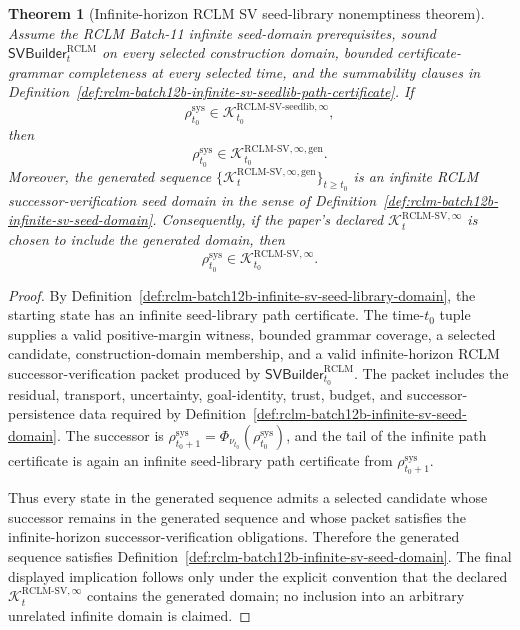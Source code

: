 \documentclass[11pt,a4paper]{article}
\newtheorem{theorem}{Theorem}[section]
\newcommand{\Kcal}{\mathcal K}
\newcommand{\RCLM}{\mathrm{RCLM}}
\newcommand{\sys}{\mathrm{sys}}
\begin{document}
\begin{theorem}[Infinite-horizon RCLM SV seed-library nonemptiness theorem]
\label{thm:rclm-batch12b-infinite-sv-seed-library-nonemptiness}
Assume the RCLM Batch-11 infinite seed-domain prerequisites, sound \(\mathsf{SVBuilder}_t^{\RCLM}\) on every selected construction domain, bounded certificate-grammar completeness at every selected time, and the summability clauses in Definition~\ref{def:rclm-batch12b-infinite-sv-seedlib-path-certificate}. If
\[
\rho_{t_0}^{\sys}\in\Kcal_{t_0}^{\RCLM\text{-}\mathrm{SV\mbox{-}seedlib},\infty},
\]
then
\[
\rho_{t_0}^{\sys}\in\Kcal_{t_0}^{\RCLM\text{-}\mathrm{SV},\infty,\mathrm{gen}}.
\]
Moreover, the generated sequence \(\{\Kcal_t^{\RCLM\text{-}\mathrm{SV},\infty,\mathrm{gen}}\}_{t\ge t_0}\) is an infinite RCLM successor-verification seed domain in the sense of Definition~\ref{def:rclm-batch12b-infinite-sv-seed-domain}. Consequently, if the paper's declared \(\Kcal_t^{\RCLM\text{-}\mathrm{SV},\infty}\) is chosen to include the generated domain, then
\[
\rho_{t_0}^{\sys}\in\Kcal_{t_0}^{\RCLM\text{-}\mathrm{SV},\infty}.
\]
\end{theorem}

\begin{proof}
By Definition~\ref{def:rclm-batch12b-infinite-sv-seed-library-domain}, the starting state has an infinite seed-library path certificate. The time-\(t_0\) tuple supplies a valid positive-margin witness, bounded grammar coverage, a selected candidate, construction-domain membership, and a valid infinite-horizon RCLM successor-verification packet produced by \(\mathsf{SVBuilder}_{t_0}^{\RCLM}\). The packet includes the residual, transport, uncertainty, goal-identity, trust, budget, and successor-persistence data required by Definition~\ref{def:rclm-batch12b-infinite-sv-seed-domain}. The successor is \(\rho_{t_0+1}^{\sys}=\Phi_{\nu_{t_0}}(\rho_{t_0}^{\sys})\), and the tail of the infinite path certificate is again an infinite seed-library path certificate from \(\rho_{t_0+1}^{\sys}\).

Thus every state in the generated sequence admits a selected candidate whose successor remains in the generated sequence and whose packet satisfies the infinite-horizon successor-verification obligations. Therefore the generated sequence satisfies Definition~\ref{def:rclm-batch12b-infinite-sv-seed-domain}. The final displayed implication follows only under the explicit convention that the declared \(\Kcal_t^{\RCLM\text{-}\mathrm{SV},\infty}\) contains the generated domain; no inclusion into an arbitrary unrelated infinite domain is claimed.
\end{proof}
\end{document}
